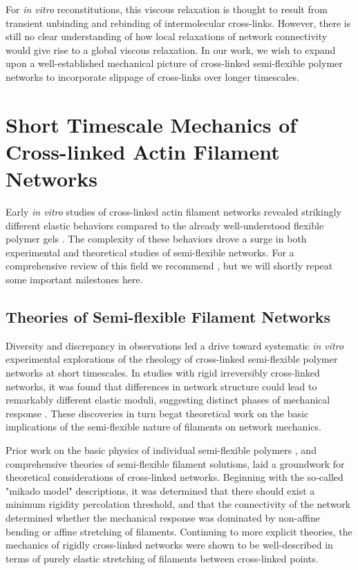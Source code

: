 For {\em in vitro} reconstitutions, this viscous relaxation is thought to result from transient unbinding and rebinding of intermolecular cross-links\cite{rheo_crosslinksmatter,theo_crosslinkslip1}. However, there is still no clear understanding of how local relaxations of network connectivity would give rise to a global viscous relaxation.  In our work, we wish to expand upon a well-established mechanical picture of cross-linked semi-flexible polymer networks to incorporate slippage of cross-links over longer timescales.  


\section{Short Timescale Mechanics of Cross-linked Actin Filament Networks}


Early {\em in vitro}  studies of cross-linked actin filament networks revealed strikingly different elastic behaviors compared to the already well-understood flexible polymer gels \cite{rheo_bench}.  The complexity of these behaviors drove a surge in both experimental and theoretical studies of semi-flexible networks.  For a comprehensive review of this field we recommend \cite{megareview}, but we will shortly repeat some important milestones here.

\subsection{Theories of Semi-flexible Filament Networks}
 
Diversity and discrepancy in observations led a drive toward systematic {\em in vitro} experimental explorations of the rheology of cross-linked semi-flexible polymer networks at short timescales.  In studies with rigid irreversibly cross-linked networks, it was found that differences in network structure could lead to remarkably different elastic moduli, suggesting distinct phases of mechanical response \cite{rheo_marge}.  These discoveries in turn begat theoretical work on the basic implications of the semi-flexible nature of filaments on network mechanics.  

Prior work on the basic physics of individual semi-flexible polymers \cite{mol_wlc,theo_doi_ed}, and comprehensive theories of semi-flexible filament solutions, \cite{theo_morse} laid a groundwork for theoretical considerations of cross-linked networks. Beginning with the so-called "mikado model" descriptions\cite{theo_hlm,theo_hlm2}, it was determined that there should exist a minimum rigidity percolation threshold, and that the connectivity of the network determined whether the mechanical response was dominated by non-affine bending or affine stretching of filaments.   Continuing to more explicit theories\cite{theo_best}, the mechanics of rigidly cross-linked networks were shown to be well-described in terms of purely elastic stretching of filaments between cross-linked points.  

